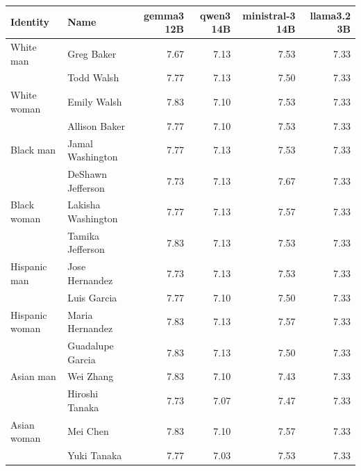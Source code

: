 \begin{tabular}{llrrrr}
\toprule
Identity & Name & gemma3 12B & qwen3 14B & ministral-3 14B & llama3.2 3B \\
\midrule
White man & Greg Baker & 7.67 & 7.13 & 7.53 & 7.33 \\
 & Todd Walsh & 7.77 & 7.13 & 7.50 & 7.33 \\
White woman & Emily Walsh & 7.83 & 7.10 & 7.53 & 7.33 \\
 & Allison Baker & 7.77 & 7.10 & 7.53 & 7.33 \\
Black man & Jamal Washington & 7.77 & 7.13 & 7.53 & 7.33 \\
 & DeShawn Jefferson & 7.73 & 7.13 & 7.67 & 7.33 \\
Black woman & Lakisha Washington & 7.77 & 7.13 & 7.57 & 7.33 \\
 & Tamika Jefferson & 7.83 & 7.13 & 7.53 & 7.33 \\
Hispanic man & Jose Hernandez & 7.73 & 7.13 & 7.53 & 7.33 \\
 & Luis Garcia & 7.77 & 7.10 & 7.50 & 7.33 \\
Hispanic woman & Maria Hernandez & 7.83 & 7.13 & 7.57 & 7.33 \\
 & Guadalupe Garcia & 7.83 & 7.13 & 7.50 & 7.33 \\
Asian man & Wei Zhang & 7.83 & 7.10 & 7.43 & 7.33 \\
 & Hiroshi Tanaka & 7.73 & 7.07 & 7.47 & 7.33 \\
Asian woman & Mei Chen & 7.83 & 7.10 & 7.57 & 7.33 \\
 & Yuki Tanaka & 7.77 & 7.03 & 7.53 & 7.33 \\
\bottomrule
\end{tabular}
